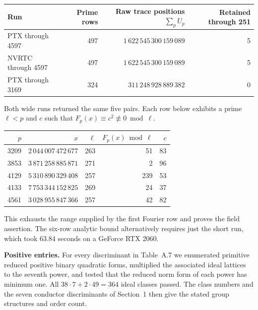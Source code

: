 \documentclass[11pt,letterpaper]{article}
\begin{document}
\begin{center}
\begin{tabular}{@{}lrrr@{}}
\toprule
Run&Prime rows&Raw trace positions \(\sum_p U_p\)&Retained through 251\\
\midrule
PTX through 4597&497&\(1\,622\,545\,300\,159\,089\)&5\\
NVRTC through 4597&497&\(1\,622\,545\,300\,159\,089\)&5\\
PTX through 3169&324&\(311\,248\,928\,889\,382\)&0\\
\bottomrule
\end{tabular}
\end{center}
Both wide runs returned the same five pairs. Each row below exhibits a
prime \(\ell<p\) and \(c\) such that \(F_p(x)\equiv c^2\not\equiv0\bmod\ell\).
\begin{center}
\begin{tabular}{@{}rrrrr@{}}
\toprule
\(p\)&\(x\)&\(\ell\)&\(F_p(x)\bmod\ell\)&\(c\)\\
\midrule
3209&\(2\,044\,007\,472\,677\)&263&51&83\\
3853&\(3\,871\,258\,885\,871\)&271&2&96\\
4129&\(5\,310\,890\,329\,408\)&257&239&53\\
4133&\(7\,753\,344\,152\,825\)&269&24&37\\
4561&\(3\,028\,955\,847\,366\)&257&42&82\\
\bottomrule
\end{tabular}
\end{center}
This exhausts the range supplied by the first Fourier row and proves the
field assertion. The six-row analytic bound alternatively requires just
the short run, which took \(63.84\) seconds on a GeForce RTX 2060.

\textbf{Positive entries.}
For every discriminant in Table~A.7 we enumerated primitive reduced positive
binary quadratic forms, multiplied the associated ideal lattices to the
seventh power, and tested that the reduced norm form of each power has
minimum one. All \(38\cdot7+2\cdot49=364\) ideal classes passed. The
class numbers and the seven conductor discriminants of Section~1 then give
the stated group structures and order count.
\end{document}
